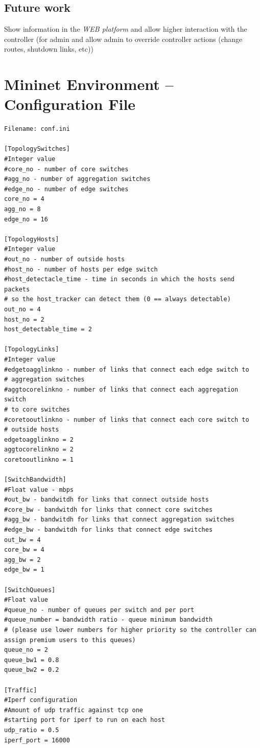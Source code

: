 \documentclass[12pt,english,oneside]{book}
\begin{document}
\section{Future work}

Show information in the \textit{WEB platform} and allow higher interaction with the controller (for admin and allow admin to override controller actions (change routes, shutdown links, etc))

\appendix

\chapter{Mininet Environment -- Configuration File\label{app:minconf}}

\begin{lstlisting}
Filename: conf.ini

[TopologySwitches]
#Integer value
#core_no - number of core switches
#agg_no - number of aggregation switches
#edge_no - number of edge switches
core_no = 4
agg_no = 8
edge_no = 16

[TopologyHosts]
#Integer value
#out_no - number of outside hosts
#host_no - number of hosts per edge switch
#host_detectacle_time - time in seconds in which the hosts send packets 
# so the host_tracker can detect them (0 == always detectable)
out_no = 4
host_no = 2
host_detectable_time = 2

[TopologyLinks]
#Integer value
#edgetoagglinkno - number of links that connect each edge switch to 
# aggregation switches
#aggtocorelinkno - number of links that connect each aggregation switch 
# to core switches
#coretooutlinkno - number of links that connect each core switch to 
# outside hosts
edgetoagglinkno = 2
aggtocorelinkno = 2
coretooutlinkno = 1

[SwitchBandwidth]
#Float value - mbps
#out_bw - bandwitdh for links that connect outside hosts
#core_bw - bandwitdh for links that connect core switches
#agg_bw - bandwitdh for links that connect aggregation switches
#edge_bw - bandwitdh for links that connect edge switches
out_bw = 4
core_bw = 4
agg_bw = 2
edge_bw = 1

[SwitchQueues]
#Float value
#queue_no - number of queues per switch and per port
#queue_number = bandwidth ratio - queue minimum bandwidth 
# (please use lower numbers for higher priority so the controller can assign premium users to this queues)  
queue_no = 2
queue_bw1 = 0.8
queue_bw2 = 0.2

[Traffic]
#Iperf configuration
#Amount of udp traffic against tcp one
#starting port for iperf to run on each host
udp_ratio = 0.5
iperf_port = 16000

\end{lstlisting}
\end{document}
